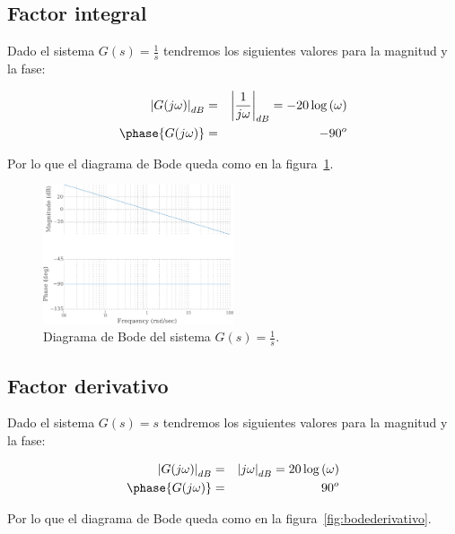         \subsection{Factor integral}

            Dado el sistema $G(s) = \frac{1}{s}$ tendremos los siguientes valores para la magnitud y la fase:

            \begin{eqnarray*}
                \left| G(j \omega) \right|_{dB} & = & \left| \frac{1}{j \omega} \right|_{dB} = -20 \log{(\omega)} \\
                \phase{G(j \omega)} & = & -90^o
            \end{eqnarray*}

            Por lo que el diagrama de Bode queda como en la figura~\ref{fig:bodeintegral}.

            \begin{figure}
                \centering
                \includegraphics[width=0.5\textwidth]{./imagenes/bodeintegral.pdf}
                \caption{\label{fig:bodeintegral}Diagrama de Bode del sistema $G(s) = \frac{1}{s}$.}
            \end{figure}

        \subsection{Factor derivativo}

            Dado el sistema $G(s) = s$ tendremos los siguientes valores para la magnitud y la fase:

            \begin{eqnarray*}
                \left| G(j \omega) \right|_{dB} & = & \left| j \omega \right|_{dB} = 20 \log{(\omega)} \\
                \phase{G(j \omega)} & = & 90^o
            \end{eqnarray*}

            Por lo que el diagrama de Bode queda como en la figura~\ref{fig:bodederivativo}.

